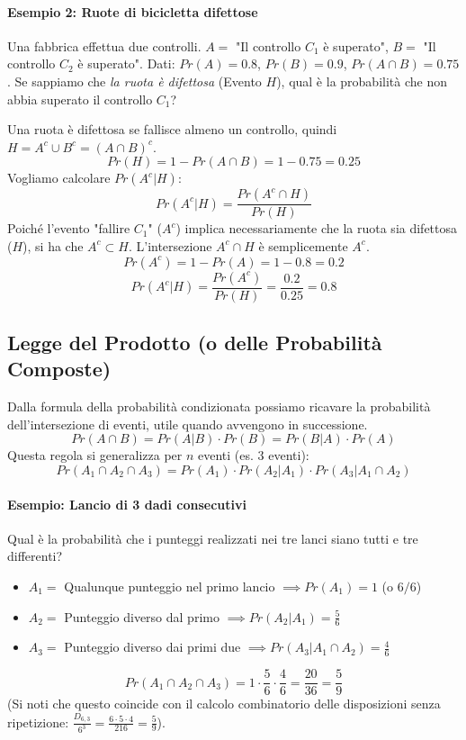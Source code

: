 \documentclass[12pt, a4paper]{article}
\begin{document}
\paragraph{Esempio 2: Ruote di bicicletta difettose}
Una fabbrica effettua due controlli.
$A =$ "Il controllo $C_1$ è superato", $B =$ "Il controllo $C_2$ è superato".
Dati: $Pr(A) = 0.8$, $Pr(B) = 0.9$, $Pr(A \cap B) = 0.75$.
Se sappiamo che \textit{la ruota è difettosa} (Evento $H$), qual è la probabilità che non abbia superato il controllo $C_1$?

Una ruota è difettosa se fallisce almeno un controllo, quindi $H = A^c \cup B^c = (A \cap B)^c$.
$$ Pr(H) = 1 - Pr(A \cap B) = 1 - 0.75 = 0.25 $$
Vogliamo calcolare $Pr(A^c | H)$:
$$ Pr(A^c | H) = \frac{Pr(A^c \cap H)}{Pr(H)} $$
Poiché l'evento "fallire $C_1$" ($A^c$) implica necessariamente che la ruota sia difettosa ($H$), si ha che $A^c \subset H$. L'intersezione $A^c \cap H$ è semplicemente $A^c$.
$$ Pr(A^c) = 1 - Pr(A) = 1 - 0.8 = 0.2 $$
$$ Pr(A^c | H) = \frac{Pr(A^c)}{Pr(H)} = \frac{0.2}{0.25} = 0.8 $$

\subsection{Legge del Prodotto (o delle Probabilità Composte)}
Dalla formula della probabilità condizionata possiamo ricavare la probabilità dell'intersezione di eventi, utile quando avvengono in successione.
$$ Pr(A \cap B) = Pr(A | B) \cdot Pr(B) = Pr(B | A) \cdot Pr(A) $$
Questa regola si generalizza per $n$ eventi (es. 3 eventi):
$$ Pr(A_1 \cap A_2 \cap A_3) = Pr(A_1) \cdot Pr(A_2 | A_1) \cdot Pr(A_3 | A_1 \cap A_2) $$

\paragraph{Esempio: Lancio di 3 dadi consecutivi}
Qual è la probabilità che i punteggi realizzati nei tre lanci siano tutti e tre differenti?
\begin{itemize}
    \item $A_1 =$ Qualunque punteggio nel primo lancio $\implies Pr(A_1) = 1$ (o $6/6$)
    \item $A_2 =$ Punteggio diverso dal primo $\implies Pr(A_2 | A_1) = \frac{5}{6}$
    \item $A_3 =$ Punteggio diverso dai primi due $\implies Pr(A_3 | A_1 \cap A_2) = \frac{4}{6}$
\end{itemize}
$$ Pr(A_1 \cap A_2 \cap A_3) = 1 \cdot \frac{5}{6} \cdot \frac{4}{6} = \frac{20}{36} = \frac{5}{9} $$
(Si noti che questo coincide con il calcolo combinatorio delle disposizioni senza ripetizione: $\frac{D_{6,3}}{6^3} = \frac{6 \cdot 5 \cdot 4}{216} = \frac{5}{9}$).
\end{document}
